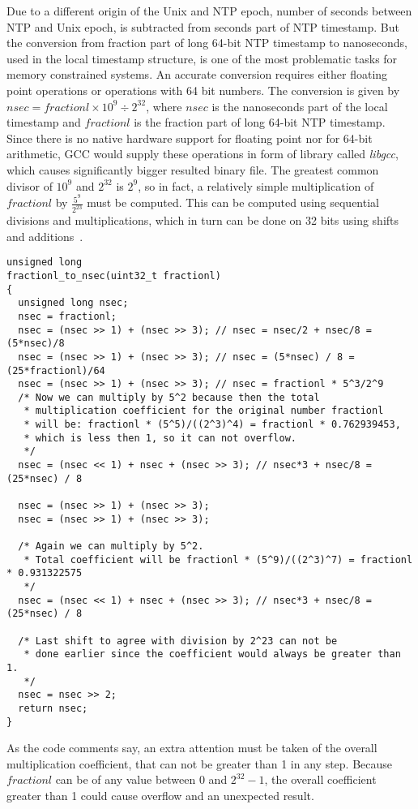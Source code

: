 Due to a different origin of the Unix and NTP epoch,
number of seconds between NTP and Unix epoch,
is subtracted from seconds part of NTP timestamp.
But the conversion from fraction part of long 64-bit NTP timestamp to nanoseconds,
used in the local timestamp structure,
is one of the most problematic tasks for memory constrained systems.
An accurate conversion requires either floating point operations or operations with 64 bit numbers.
The conversion is given by
$nsec = fractionl \times 10^9 \div 2^{32}$, where $nsec$ is the nanoseconds part of the local timestamp
and $fractionl$ is the fraction part of long 64-bit NTP timestamp.
Since there is no native hardware support for floating point nor for 64-bit arithmetic,
GCC would supply these operations in form of library called {\it{libgcc}},
which causes significantly bigger resulted binary file.
The greatest common divisor of $10^9$ and $2^{32}$ is $2^9$,
so in fact, a relatively simple multiplication of $fractionl$ by $\frac{5^9}{2^{23}}$ must be computed.
This can be computed using sequential divisions and multiplications,
which in turn can be done on 32 bits using shifts and additions~\cite{c99}.
\begin{lstlisting}[caption=Conversion from NTP fraction part to nanoseconds]
unsigned long
fractionl_to_nsec(uint32_t fractionl)
{
  unsigned long nsec;
  nsec = fractionl;
  nsec = (nsec >> 1) + (nsec >> 3); // nsec = nsec/2 + nsec/8 = (5*nsec)/8
  nsec = (nsec >> 1) + (nsec >> 3); // nsec = (5*nsec) / 8 = (25*fractionl)/64
  nsec = (nsec >> 1) + (nsec >> 3); // nsec = fractionl * 5^3/2^9
  /* Now we can multiply by 5^2 because then the total
   * multiplication coefficient for the original number fractionl
   * will be: fractionl * (5^5)/((2^3)^4) = fractionl * 0.762939453,
   * which is less then 1, so it can not overflow.
   */
  nsec = (nsec << 1) + nsec + (nsec >> 3); // nsec*3 + nsec/8 = (25*nsec) / 8

  nsec = (nsec >> 1) + (nsec >> 3);
  nsec = (nsec >> 1) + (nsec >> 3);

  /* Again we can multiply by 5^2.
   * Total coefficient will be fractionl * (5^9)/((2^3)^7) = fractionl * 0.931322575
   */
  nsec = (nsec << 1) + nsec + (nsec >> 3); // nsec*3 + nsec/8 = (25*nsec) / 8

  /* Last shift to agree with division by 2^23 can not be
   * done earlier since the coefficient would always be greater than 1.
   */
  nsec = nsec >> 2;
  return nsec;
}
\end{lstlisting}
As the code comments say, an extra attention must be taken of the overall
multiplication coefficient,
that can not be greater than 1 in any step.
Because $fractionl$ can be of any value between $0$ and $2^{32}-1$,
the overall coefficient greater than 1 could cause overflow and an unexpected result.

